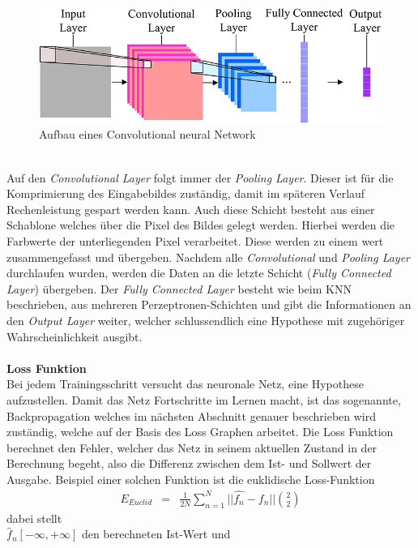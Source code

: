 \documentclass[a4paper,12pt,oneside]{article}
\begin{document}
\begin{figure}
	[h]
	\centering
	\includegraphics[scale=0.5]{Sources/cnnet.jpg}
	\caption{Aufbau eines Convolutional neural Network \cite{info7040061}}
	\label{img:cnn}
\end{figure}\\
Auf den \textit{Convolutional Layer} folgt immer der \textit{Pooling Layer}. Dieser ist für die Komprimierung des Eingabebildes zuständig, damit im späteren Verlauf Rechenleistung gespart werden kann. Auch diese Schicht besteht aus einer Schablone welches über die Pixel des Bildes gelegt werden. Hierbei werden die Farbwerte der unterliegenden Pixel verarbeitet. Diese werden zu einem wert zusammengefasst und übergeben. Nachdem alle \textit{Convolutional} und \textit{Pooling Layer} durchlaufen wurden, werden die Daten an die letzte Schicht (\textit{Fully Connected Layer}) übergeben. Der \textit{Fully Connected Layer} besteht wie beim KNN beschrieben, aus mehreren Perzeptronen-Schichten und gibt die Informationen an den \textit{Output Layer} weiter, welcher schlussendlich eine Hypothese mit zugehöriger Wahrscheinlichkeit ausgibt.\\\\
\textbf{Loss Funktion}\\
Bei jedem Trainingsschritt versucht das neuronale Netz, eine Hypothese aufzustellen. Damit das Netz Fortschritte im Lernen macht, ist das sogenannte, Backpropagation welches im nächsten Abschnitt genauer beschrieben wird zuständig, welche auf der Basis des Loss Graphen arbeitet. Die Loss Funktion berechnet den Fehler, welcher das Netz in seinem aktuellen Zustand in der Berechnung begeht, also die Differenz zwischen dem Ist- und Sollwert der Ausgabe. Beispiel einer solchen Funktion ist die euklidische Loss-Funktion
\begin{eqnarray} E_{Euclid}&=&\frac{1}{2N} \sum_{n=1}^N || \hat{f_{n}}-f_{n} || \binom{2}{2} \end{eqnarray}
dabei stellt\\

	$\hat{f}_{n}[-\infty,+\infty]$ den berechneten Ist-Wert und
	
\end{document}

